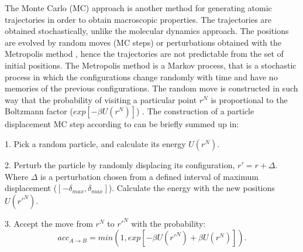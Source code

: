 	The Monte Carlo (MC) approach is another method for generating atomic trajectories in order to obtain macroscopic properties. The trajectories are obtained stochastically, unlike the molecular dynamics approach. The positions are evolved by random moves (MC steps) or perturbations obtained with the Metropolis method \cite{1953JChPh..21.1087M}, hence the trajectories are not predictable from the set of initial positions. The Metropolis method is a Markov process, that is a stochastic process in which the configurations change randomly with time and have no memories of the previous configurations. The random move is constructed in such way that the probability of visiting a particular point $r^{N}$ is proportional to the Boltzmann factor ($exp[-\beta U(r^{N})]$) \cite{frenkel}. The construction of a  particle displacement MC step according to  can be briefly summed up in:
	
	1. Pick a random particle, and calculate its energy $U(r^{N})$.
	
	2. Perturb the particle by randomly displacing  its configuration, $r' = r +\Delta$. Where $\Delta$ is a perturbation chosen from a defined interval of maximum displacement ($[- \delta _{max},\delta _{max}]$). Calculate the energy with the new positions $U(r'^{N})$.
	
	3. Accept the move from $r^{N}$ to $r'^{N}$ with the probability:
	\begin{equation}
	acc_{A \rightarrow B} = min(1,exp[-\beta U(r'^{N}) + \beta U(r^{N}) ]) .
	\end{equation}
	
